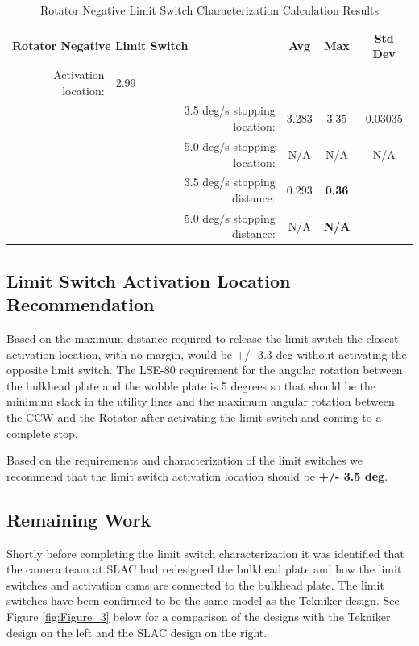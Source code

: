 \documentclass[SE,lsstdraft,authoryear,toc]{lsstdoc}
\begin{document}
\begin{landscape}
\begin{table}[h!]
  \begin{center}
    \caption{Rotator Negative Limit Switch Characterization Calculation Results}
    \label{tab:table4}
    \begin{tabular}{r|c|r|c|c|c}
    \multicolumn{3}{l|}{\textbf{Rotator Negative Limit Switch}} & Avg & Max & Std Dev\\
    \midrule
    Activation location: & 2.99 & & & & \\
    & & 3.5 deg/s stopping location: & 3.283 & 3.35 & 0.03035 \\
    & & 5.0 deg/s stopping location: & N/A & N/A & N/A \\
    & & 3.5 deg/s stopping distance: & 0.293 & \textbf{0.36} & \\
    & & 5.0 deg/s stopping distance: & N/A & \textbf{N/A} & \\
    \end{tabular}
  \end{center}
\end{table}

\end{landscape}

\subsection{Limit Switch Activation Location Recommendation}

Based on the maximum distance required to release the limit switch the
closest activation location, with no margin, would be +/- 3.3 deg
without activating the opposite limit switch. The LSE-80 requirement for
the angular rotation between the bulkhead plate and the wobble plate is
5 degrees so that should be the minimum slack in the utility lines and
the maximum angular rotation between the CCW and the Rotator after
activating the limit switch and coming to a complete stop.

Based on the requirements and characterization of the limit switches we
recommend that the limit switch activation location should be
\textbf{+/- 3.5 deg}.

\subsection{Remaining Work}

Shortly before completing the limit switch characterization it was
identified that the camera team at SLAC had redesigned the bulkhead
plate and how the limit switches and activation cams are connected to
the bulkhead plate. The limit switches have been confirmed to be the
same model as the Tekniker design. See Figure \ref{fig:Figure_3} below for a comparison
of the designs with the Tekniker design on the left and the SLAC design
on the right.
\end{document}

